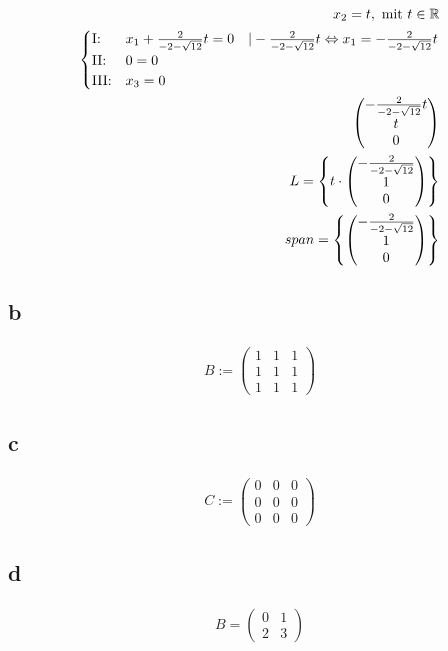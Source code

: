 \begin{longtable}{p{10cm}}
\end{longtable}

\begin{align*}
    x_2 = t, \text{ mit } t \in \mathbb{R} \\
    \begin{cases}
        \text{I:\@} & x_1 + \frac{2}{-2-\sqrt{12}}t = 0 \quad | - \frac{2}{-2-\sqrt{12}}t \Leftrightarrow x_1 = -\frac{2}{-2-\sqrt{12}}t\\
        \text{II:\@} & 0 = 0 \\
        \text{III:\@} & x_3 = 0
    \end{cases} \\
    \begin{pmatrix}
        -\frac{2}{-2-\sqrt{12}}t \\
        t \\
        0
    \end{pmatrix} \\
    L = \left\{t \cdot \begin{pmatrix}
        -\frac{2}{-2-\sqrt{12}} \\
        1 \\
        0
    \end{pmatrix}\right\} \\
    span = \left\{\begin{pmatrix}
        -\frac{2}{-2-\sqrt{12}} \\
        1 \\
        0
    \end{pmatrix}\right\}
\end{align*}

\subsection{b}

\begin{align*}
    B := \begin{pmatrix}
        1 & 1 & 1 \\
        1 & 1 & 1 \\
        1 & 1 & 1
    \end{pmatrix}
\end{align*}

\subsection{c}

\begin{align*}
    C := \begin{pmatrix}
        0 & 0 & 0 \\
        0 & 0 & 0 \\
        0 & 0 & 0
    \end{pmatrix}
\end{align*}

\subsection{d}

\begin{align*}
    B = \begin{pmatrix}
        0 & 1 \\
        2 & 3
    \end{pmatrix}
\end{align*}